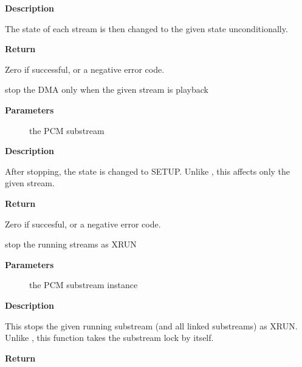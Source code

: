 \documentclass[a4paper,8pt,english]{sphinxmanual}
\begin{document}
\textbf{Description}

The state of each stream is then changed to the given state unconditionally.

\textbf{Return}

Zero if successful, or a negative error code.

\begin{fulllineitems}
\label{sound/kernel-api/alsa-driver-api:c.snd_pcm_drain_done}
stop the DMA only when the given stream is playback

\end{fulllineitems}


\textbf{Parameters}
\begin{description}
\item[{}] \leavevmode
the PCM substream

\end{description}

\textbf{Description}

After stopping, the state is changed to SETUP.
Unlike , this affects only the given stream.

\textbf{Return}

Zero if succesful, or a negative error code.

\begin{fulllineitems}
\label{sound/kernel-api/alsa-driver-api:c.snd_pcm_stop_xrun}
stop the running streams as XRUN

\end{fulllineitems}


\textbf{Parameters}
\begin{description}
\item[{}] \leavevmode
the PCM substream instance

\end{description}

\textbf{Description}

This stops the given running substream (and all linked substreams) as XRUN.
Unlike , this function takes the substream lock by itself.

\textbf{Return}
\end{document}
